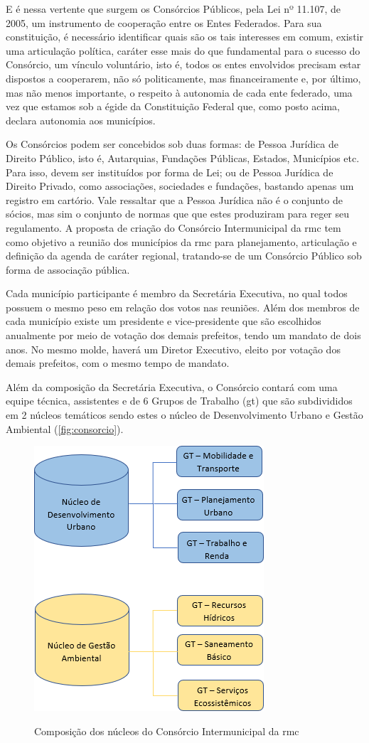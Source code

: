 	E é nessa vertente que surgem os Consórcios Públicos, pela Lei nº 11.107, de 2005, um instrumento de cooperação entre os Entes Federados. Para sua constituição, é necessário identificar quais são os tais interesses em comum, existir uma articulação política, caráter esse mais do que fundamental para o sucesso do Consórcio, um vínculo voluntário, isto é, todos os entes envolvidos precisam estar dispostos a cooperarem, não só politicamente, mas financeiramente e, por último, mas não menos importante, o respeito à autonomia de cada ente federado, uma vez que estamos sob a égide da Constituição Federal que, como posto acima, declara autonomia aos municípios. 
	
	Os Consórcios podem ser concebidos sob duas formas: de Pessoa Jurídica de Direito Público, isto é, Autarquias, Fundações Públicas, Estados, Municípios etc. Para isso, devem ser instituídos por forma de Lei; ou de Pessoa Jurídica de Direito Privado, como associações, sociedades e fundações, bastando apenas um registro em cartório. Vale ressaltar que a Pessoa Jurídica não é o conjunto de sócios, mas sim o conjunto de normas que que estes produziram para reger seu regulamento.
	A proposta de criação do Consórcio Intermunicipal da \glsdesc{rmc} tem como objetivo a reunião dos municípios da \gls{rmc} para planejamento, articulação e definição da agenda de caráter regional, tratando-se de um Consórcio Público sob forma de associação pública.
	
	Cada município participante é membro da Secretária Executiva, no qual todos possuem o mesmo peso em relação dos votos nas reuniões. Além dos membros de cada município existe um presidente e vice-presidente que são escolhidos anualmente por meio de votação dos demais prefeitos, tendo um mandato de dois anos. No mesmo molde, haverá um Diretor Executivo, eleito por votação dos demais prefeitos, com o mesmo tempo de mandato. 
	
	Além da composição da Secretária Executiva, o Consórcio contará com uma equipe técnica, assistentes e de 6 Grupos de Trabalho (\gls{gt}) que são subdivididos em 2 núcleos temáticos sendo estes o núcleo de Desenvolvimento Urbano e Gestão Ambiental (\autoref{fig:consorcio}).
	
	\begin{figure}
		\centering
		\caption{Composição dos núcleos do Consórcio Intermunicipal da \glsdesc{rmc}}
		\includegraphics[width=0.4\linewidth]{img/consorcio_A}
		\label{fig:consorcio}
	\end{figure}

